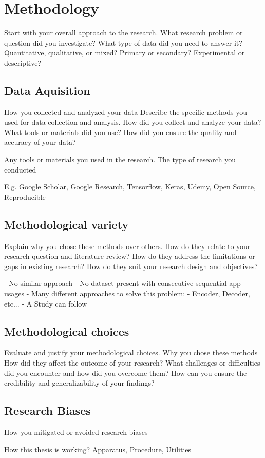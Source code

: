 \chapter{Methodology}

Start with your overall approach to the research.
What research problem or question did you investigate?
What type of data did you need to answer it?
Quantitative, qualitative, or mixed? Primary or secondary? Experimental or descriptive?

\section{Data Aquisition}
How you collected and analyzed your data
Describe the specific methods you used for data collection and analysis.
How did you collect and analyze your data?
What tools or materials did you use?
How did you ensure the quality and accuracy of your data?


Any tools or materials you used in the research.
The type of research you conducted

E.g. Google Scholar, Google Research, Tensorflow, Keras, Udemy, Open Source, Reproducible

\section{Methodological variety}
Explain why you chose these methods over others.
How do they relate to your research question and literature review?
How do they address the limitations or gaps in existing research?
How do they suit your research design and objectives?

- No similar approach
- No dataset present with consecutive sequential app usages
- Many different approaches to solve this problem:
    - Encoder, Decoder, etc...
- A Study can follow

\section{Methodological choices}
Evaluate and justify your methodological choices.
Why you chose these methods
How did they affect the outcome of your research?
What challenges or difficulties did you encounter and how did you overcome them?
How can you ensure the credibility and generalizability of your findings?


\section{Research Biases}
How you mitigated or avoided research biases

How this thesis is working?
Apparatus, Procedure, Utilities
